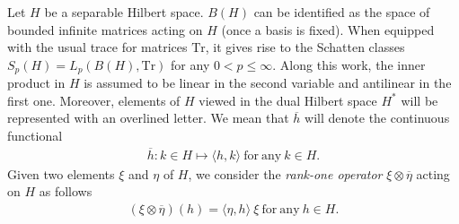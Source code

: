 \documentclass[psamsfonts]{amsart}
\newcommand{\Lp}{L_p}
\begin{document}
    \medskip
    






    Let $H$ be a separable
    Hilbert space. $B(H)$ can be identified as the space of bounded
    infinite matrices acting on $H$ (once a basis is fixed). When equipped with the usual
    trace for matrices $\mathrm{Tr}$, it gives rise to the Schatten
    classes $S_p(H) = \Lp(B(H),\mathrm{Tr})$ for any
    $0 < p \leq \infty$. Along this work, the inner product in $H$ is
    assumed to be linear in the second variable and antilinear in the
    first one. Moreover, elements of $H$ viewed in the dual Hilbert
    space $H^*$ will be represented with an overlined letter. We mean
    that $\overline{h}$ will denote the continuous functional
    \begin{align*}
        \overline{h} : k \in H \mapsto \langle h, k \rangle \ \mathrm{for \ any \ } k \in H.
    \end{align*}
    Given two elements $\xi$ and $\eta$ of $H$, we consider
    the \emph{rank-one operator} $\xi \otimes \overline \eta$ acting on $H$ as
    follows
    \begin{align*}
        (\xi \otimes \overline \eta)(h) = \langle \eta, h \rangle \ \xi \ \mathrm{for \ any \ } h \in H.
    \end{align*}
    

   
    
\end{document}
